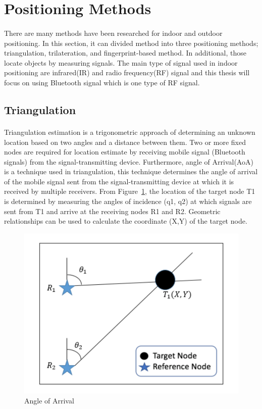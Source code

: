 \newpage
\section{Positioning Methods}
\paragraph{}
There are many methods have been researched for indoor and outdoor positioning. In this section, it can divided method into three positioning methods;  triangulation, trilateration, and fingerprint-based method. In additional, those locate objects by measuring signals. The main type of signal used in indoor positioning are infrared(IR) and radio frequency(RF) signal and this thesis will focus on using Bluetooth signal which is one type of RF signal.

\subsection{Triangulation}
\paragraph{}Triangulation estimation is a trigonometric approach of determining an unknown location based on two angles and a distance between them. Two or more fixed nodes are required for location estimate by receiving mobile signal (Bluetooth signals) from the signal-transmitting device. Furthermore, angle of Arrival(AoA) is a technique used in triangulation, this technique determines the angle of arrival of the mobile signal sent from the signal-transmitting device at which it is received by multiple receivers. From Figure~\ref{fig:aoa}, the location of the target node T1 is determined by measuring the angles of incidence (q1, q2) at which signals are sent from T1 and arrive at the receiving nodes R1 and R2. Geometric relationships can be used to calculate the coordinate (X,Y) of the target node.
\begin{figure}[h]
\centering
\includegraphics[scale = 0.7]{Image/triangulation.png}
\caption{Angle of Arrival}
\label{fig:aoa}
\end{figure}


